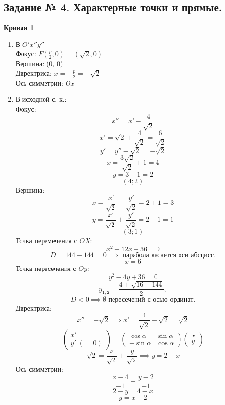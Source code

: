 \documentclass{article}
\theoremstyle{plain}
\begin{document}
\begin{enumerate}
    \section{Задание № 4. Характерные точки и прямые.}
    \textbf{Кривая 1}
    \begin{enumerate}
    \item В $O'x''y''$:\\
    \vspace{2mm}
    Фокус: $F(\frac{p}{2}, 0) = (\sqrt{2}, 0)$\\
    \vspace{2mm}
    Вершина: (0, 0)\\
    \vspace{2mm}
    Директриса: $x = -\frac{p}{2} = -\sqrt{2}$\\
    \vspace{2mm}
    Ось симметрии: $Ox$
    \item В исходной с. к.:\\
    Фокус: 
    $$x'' = x' - \frac{4}{\sqrt{2}}$$
    $$x' = \sqrt{2} + \frac{4}{\sqrt{2}} = \frac{6}{\sqrt{2}}$$
    $$y' = y'' - \sqrt{2} = -\sqrt{2}$$
    $$x = \frac{3\sqrt{2}}{\sqrt{2}} + 1 = 4$$
    $$y = 3 - 1 = 2$$
    $$(4; 2)$$
    Вершина:
    $$x = \frac{x'}{\sqrt{2}} - \frac{y'}{\sqrt{2}} = 2 + 1 = 3$$
    $$y = \frac{x'}{\sqrt{2}} + \frac{y'}{\sqrt{2}} = 2 - 1 = 1 $$
    $$(3; 1)$$
    Точка перемечения с $OX$:
    $$x^2 - 12x + 36 = 0$$
    $$D = 144 - 144 = 0\implies \text{ парабола касается оси абсцисс.}$$
    $$x = 6$$
    Точка пересечения с $Oy$:
    $$y^2 - 4y + 36 = 0$$
    $$y_{1,2} = \frac{4 \pm \sqrt{16 - 144}}{2}, $$
    $$ D < 0 \implies \emptyset  \text{ пересечений с осью ординат.}$$
    Директриса: 
    $$x'' = -\sqrt{2}\implies x' = \frac{4}{\sqrt{2}} - \sqrt{2} = \sqrt{2}$$
    $$\begin{pmatrix}
        x'\,\\
        y'\;(= 0)
    \end{pmatrix} =  \begin{pmatrix}
        \cos{\alpha} & \sin{\alpha} \\
        -\sin{\alpha} & \cos{\alpha}
    \end{pmatrix}\begin{pmatrix}
        x \\ 
        y
    \end{pmatrix}$$
    $$\sqrt{2} = \frac{x}{\sqrt{2}} + \frac{y}{\sqrt{2}} \implies y = 2 - x$$
    Ось симметрии:
    $$\frac{x - 4}{-1} = \frac{y - 2}{-1}$$
    $$2 - y = 4 - x$$
    $$y = x - 2$$

\end{enumerate}
\end{enumerate}
\end{document}
